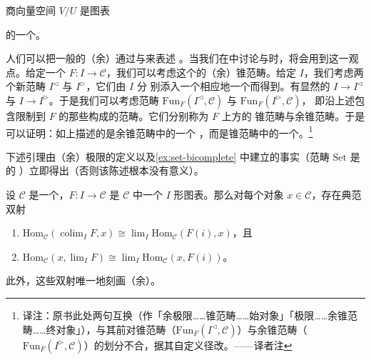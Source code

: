 \begin{example*}
商向量空间 $V/U$ 是图表
\begin{center}
\end{center}
的一个\trPushout{}。
\end{example*}

\begin{observation}\label{obs:colimits-via-initial-terminal}
人们可以把一般的（余）\trLimit{}通过\trInitialObject{}与\trTerminalObject{}来表述
。当我们在\trInfinityCategories{}中讨论\trLimit{}与\trColimit{}时，将会用到这一观
点。给定一个\trFunctor{}%
$F\colon I \to \mathcal{C}$，我们可以考虑这个\trFunctor{}的（余）锥范畴。给定\trCategory{}%
$I$，我们考虑两个新范畴 $I^{\lhd}$ 与 $I^{\rhd}$，它们由 $I$ 分
别添入一个\trInitialObject{}相应地一个\trTerminalObject{}而得到。有显然的\trFunctor{}%
$I \to I^{\lhd}$ 与 $I \to I^{\rhd}$。于是我们可以考虑\trFunctor{}范畴
$\mathrm{Fun}_F(I^{\lhd}, \mathcal{C})$ 与 $\mathrm{Fun}_F(I^{\rhd}, \mathcal{C})$，
即沿上述包含限制到 $F$ 的那些\trFunctor{}构成的范畴。它们分别称为 $F$ 上方的
锥范畴与余锥范畴。于是可以证明：如上描述的\trColimit{}是余锥范畴中的一个%
\trInitialObject{}，而\trLimit{}是锥范畴中的一个\trTerminalObject{}。\footnote{译注：原书此处两句互换（作「余极限……锥范畴……始对象」「极限……余锥范畴……终对象」），与其前对锥范畴（$\mathrm{Fun}_F(I^{\lhd},\mathcal{C})$）与余锥范畴（$\mathrm{Fun}_F(I^{\rhd},\mathcal{C})$）的划分不合，据其自定义径改。——译者注}
\end{observation}

下述引理由（余）极限的定义以及\cref{ex:set-bicomplete} 中建立的事实（范畴 $\mathrm{Set}$ 是\trBicomplete{}的
）立即得出（否则该陈述根本没有意义）。

\begin{lemma}\label{lem:hom-out-of-colimit}
设 $\mathcal{C}$ 是一个\trCategory{}，$F\colon I \to \mathcal{C}$ 是 $\mathcal{C}$
中一个 $I$ 形图表。那么对每个对象 $x \in \mathcal{C}$，存在典范双射
\begin{enumerate}[label=(\arabic*)]
  \item $\mathrm{Hom}_{\mathcal{C}}(\operatorname{colim}_I F, x) \cong \operatorname{lim}_I \mathrm{Hom}_{\mathcal{C}}(F(i), x)$，且
  \item $\mathrm{Hom}_{\mathcal{C}}(x, \operatorname{lim}_I F) \cong \operatorname{lim}_I \mathrm{Hom}_{\mathcal{C}}(x, F(i))$。
\end{enumerate}
此外，这些双射唯一地刻画（余）\trLimit{}。
\end{lemma}

